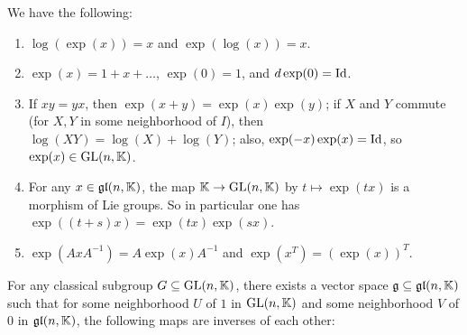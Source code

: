 \begin{theorem}
  We have the following:
  \begin{enumerate}
    \item $\log(\exp(x)) = x$ and
      $\exp(\log(x)) = x$.
    \item $\exp(x) = 1 + x + \dots$,
      $\exp(0) = 1$, and
      $d \exp(0) = \operatorname{Id}$.
    \item If $xy = yx$, then
      $\exp(x + y) = \exp(x) \exp(y)$;
    if $X$ and $Y$ commute (for
      $X, Y$ in some neighborhood of $I$), then
      $\log(XY) = \log(X) + \log(Y)$;
      also,
      $\exp(-x) \exp(x) = \operatorname{Id}$, so
      $\exp(x) \in \operatorname{GL}(n, \mathbb{K})$.
    \item For any $x \in \mathfrak{gl}(n, \mathbb{K})$,
      the map $\mathbb{K} \to \operatorname{GL}(n, \mathbb{K})$
      by $t \mapsto \exp(tx)$ is a
      morphism of Lie groups. So in
      particular one has
      $\exp((t + s)x) = \exp(tx) \exp(sx)$.
    \item $\exp(A x A^{-1}) = A \exp(x) A^{-1}$
      and $\exp(x^T) = (\exp(x))^T$.
  \end{enumerate}
\end{theorem}

\begin{theorem}
  For any classical subgroup
  $G \subseteq \operatorname{GL}(n, \mathbb{K})$, there exists
  a vector space $\mathfrak{g} \subseteq \mathfrak{gl}(n, \mathbb{K})$
  such that for some neighborhood
  $U$ of $1$ in $\operatorname{GL}(n, \mathbb{K})$ and
  some neighborhood $V$ of $0$ in
  $\mathfrak{gl}(n, \mathbb{K})$, the following
  maps are inverses of each other:
  \begin{center}
  \end{center}
\end{theorem}

